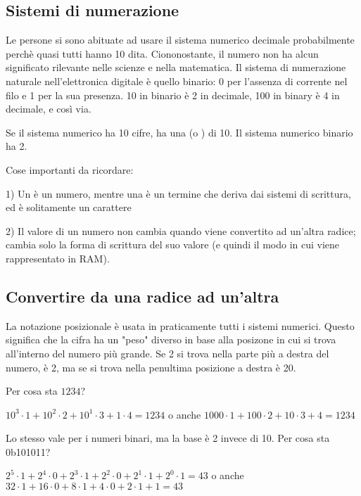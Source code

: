 \subsection{Sistemi di numerazione}

Le persone si sono abituate ad usare il sistema numerico decimale probabilmente perchè quasi tutti hanno 10 dita.
Ciononostante, il numero  non ha alcun significato rilevante nelle scienze e nella matematica.
Il sistema di numerazione naturale nell'elettronica digitale è quello binario: 0 per l'assenza di corrente nel filo e 1 per la sua presenza.
10 in binario è 2 in decimale, 100 in binary è 4 in decimale, e così via.

Se il sistema numerico ha 10 cifre, ha una  (o ) di 10.
Il sistema numerico binario ha  2.

Cose importanti da ricordare:

1) Un  è un numero, mentre una  è un termine che deriva dai sistemi di scrittura,
ed è solitamente un carattere

2) Il valore di un numero non cambia quando viene convertito ad un'altra radice;
cambia solo la forma di scrittura del suo valore (e quindi il modo in cui viene rappresentato in \ac{RAM}).

\subsection{Convertire da una radice ad un'altra}

La notazione posizionale è usata in praticamente tutti i sistemi numerici.
Questo significa che la cifra ha un "peso" diverso in base alla posizone in cui si trova all'interno del numero più grande.
Se 2 si trova nella parte più a destra del numero, è 2, ma se si trova nella penultima posizione a destra è 20.

Per cosa sta $1234$?

$10^3 \cdot 1 + 10^2 \cdot 2 + 10^1 \cdot 3 + 1 \cdot 4 = 1234$ o anche
$1000 \cdot 1 + 100 \cdot 2 + 10 \cdot 3 + 4 = 1234$

Lo stesso vale per i numeri binari, ma la base è 2 invece di 10.
Per cosa sta 0b101011?

$2^5 \cdot 1 + 2^4 \cdot 0 + 2^3 \cdot 1 + 2^2 \cdot 0 + 2^1 \cdot 1 + 2^0 \cdot 1 = 43$ o anche
$32 \cdot 1 + 16 \cdot 0 + 8 \cdot 1 + 4 \cdot 0 + 2 \cdot 1 + 1 = 43$

